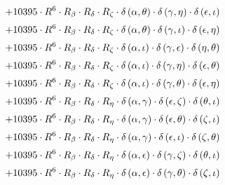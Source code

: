 \begin{subequations}
\begin{gather}
 \\[0.2em] \notag 		 + 10395 \cdot R^{6} \cdot R_{\beta{}} \cdot R_{\delta{}} \cdot R_{\zeta{}} \cdot \delta{}\left(\alpha{}, \theta{}\right) \cdot \delta{}\left(\gamma{}, \eta{}\right) \cdot \delta{}\left(\epsilon{}, \iota{}\right) 
 \\[0.2em] \notag 		 + 10395 \cdot R^{6} \cdot R_{\beta{}} \cdot R_{\delta{}} \cdot R_{\zeta{}} \cdot \delta{}\left(\alpha{}, \theta{}\right) \cdot \delta{}\left(\gamma{}, \iota{}\right) \cdot \delta{}\left(\epsilon{}, \eta{}\right) 
 \\[0.2em] \notag 		 + 10395 \cdot R^{6} \cdot R_{\beta{}} \cdot R_{\delta{}} \cdot R_{\zeta{}} \cdot \delta{}\left(\alpha{}, \iota{}\right) \cdot \delta{}\left(\gamma{}, \epsilon{}\right) \cdot \delta{}\left(\eta{}, \theta{}\right) 
 \\[0.2em] \notag 		 + 10395 \cdot R^{6} \cdot R_{\beta{}} \cdot R_{\delta{}} \cdot R_{\zeta{}} \cdot \delta{}\left(\alpha{}, \iota{}\right) \cdot \delta{}\left(\gamma{}, \eta{}\right) \cdot \delta{}\left(\epsilon{}, \theta{}\right) 
 \\[0.2em] \notag 		 + 10395 \cdot R^{6} \cdot R_{\beta{}} \cdot R_{\delta{}} \cdot R_{\zeta{}} \cdot \delta{}\left(\alpha{}, \iota{}\right) \cdot \delta{}\left(\gamma{}, \theta{}\right) \cdot \delta{}\left(\epsilon{}, \eta{}\right) 
 \\[0.2em] \notag 		 + 10395 \cdot R^{6} \cdot R_{\beta{}} \cdot R_{\delta{}} \cdot R_{\eta{}} \cdot \delta{}\left(\alpha{}, \gamma{}\right) \cdot \delta{}\left(\epsilon{}, \zeta{}\right) \cdot \delta{}\left(\theta{}, \iota{}\right) 
 \\[0.2em] \notag 		 + 10395 \cdot R^{6} \cdot R_{\beta{}} \cdot R_{\delta{}} \cdot R_{\eta{}} \cdot \delta{}\left(\alpha{}, \gamma{}\right) \cdot \delta{}\left(\epsilon{}, \theta{}\right) \cdot \delta{}\left(\zeta{}, \iota{}\right) 
 \\[0.2em] \notag 		 + 10395 \cdot R^{6} \cdot R_{\beta{}} \cdot R_{\delta{}} \cdot R_{\eta{}} \cdot \delta{}\left(\alpha{}, \gamma{}\right) \cdot \delta{}\left(\epsilon{}, \iota{}\right) \cdot \delta{}\left(\zeta{}, \theta{}\right) 
 \\[0.2em] \notag 		 + 10395 \cdot R^{6} \cdot R_{\beta{}} \cdot R_{\delta{}} \cdot R_{\eta{}} \cdot \delta{}\left(\alpha{}, \epsilon{}\right) \cdot \delta{}\left(\gamma{}, \zeta{}\right) \cdot \delta{}\left(\theta{}, \iota{}\right) 
 \\[0.2em] \notag 		 + 10395 \cdot R^{6} \cdot R_{\beta{}} \cdot R_{\delta{}} \cdot R_{\eta{}} \cdot \delta{}\left(\alpha{}, \epsilon{}\right) \cdot \delta{}\left(\gamma{}, \theta{}\right) \cdot \delta{}\left(\zeta{}, \iota{}\right) 

\end{gather}
\end{subequations}
